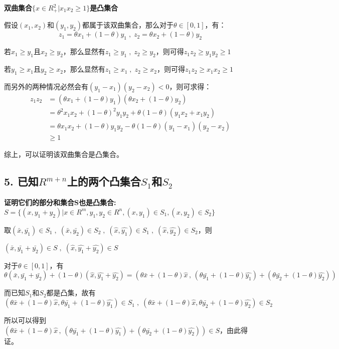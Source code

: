 \documentclass[]{article}
\begin{document}
\textbf{双曲集合$\{x\in R_+^2 | x_1 x_2≥1\}$是凸集合}

假设$(x_1,x_2)$和$(y_1,y_2)$都属于该双曲集合，那么对于$\theta\in [0,1]$，有：
$$
z_1=\theta x_1+(1-\theta)y_1\;,\;z_2=\theta x_2+(1-\theta)y_2
$$

若$x_1\geq y_1$且$x_2\geq y_2$，那么显然有$z_1\geq y_1\;,\;z_2\geq y_2$，则可得$z_1z_2\geq y_1y_2\geq 1$

若$y_1\geq x_1$且$y_2\geq x_2$，那么显然有$z_1\geq x_1\;,\;z_2\geq x_2$，则可得$z_1z_2\geq x_1x_2\geq 1$

而另外的两种情况必然会有$(y_1-x_1)(y_2-x_2)<0$，则可求得：
\begin{align*}
z_1z_2 &= (\theta x_1+(1-\theta)y_1)(\theta x_2+(1-\theta)y_2)\\
       & =\theta^2 x_1x_2+(1-\theta)^2 y_1y_2 + \theta(1-\theta)(y_1x_2+x_1y_2)\\
       & =\theta x_1x_2 + (1-\theta)y_1y_2-\theta(1-\theta)(y_1-x_1)(y_2-x_2)\\
       & \geq 1
\end{align*}

综上，可以证明该双曲集合是凸集合。

\hypertarget{header-n104}{%
\subsection{5. 已知$R^{m+n}$上的两个凸集合$S_1$和$S_2$}\label{header-n104}}

\textbf{证明它们的部分和集合S也是凸集合: $S=\{(x,y_1+y_2)|x\in R^m,y_1,y_2\in R^n,(x,y_1)\in S_1,(x,y_2)\in S_2\}$}

取$(\bar{x},\bar{y_1})\in S_1\;,\;(\bar{x},\bar{y_2})\in S_2\;,\;(\hat{x},\hat{y_1})\in S_1\;,\;(\hat{x},\hat{y_2})\in S_2$，则

$(\bar{x},\bar{y_1}+\bar{y_2})\in S\;,\;(\hat{x},\hat{y_1}+\hat{y_2})\in S$

对于$\theta\in[0,1]$，有$\theta (\bar{x},\bar{y_1}+\bar{y_2})+(1-\theta)(\hat{x},\hat{y_1}+\hat{y_2})=(\theta\bar{x}+(1-\theta)\hat{x}\,,\,(\theta\bar{y_1}+(1-\theta)\hat{y_1})+(\theta\bar{y_2}+(1-\theta)\hat{y_2}))$

而已知$S_1$和$S_2$都是凸集，故有$(\theta\bar{x}+(1-\theta)\hat{x},\theta\bar{y_1}+(1-\theta)\hat{y_1})\in S_1\;,\;(\theta\bar{x}+(1-\theta)\hat{x},\theta\bar{y_2}+(1-\theta)\hat{y_2})\in S_2$

所以可以得到$(\theta\bar{x}+(1-\theta)\hat{x}\,,\,(\theta\bar{y_1}+(1-\theta)\hat{y_1})+(\theta\bar{y_2}+(1-\theta)\hat{y_2}))\in S$，由此得证。
\end{document}
